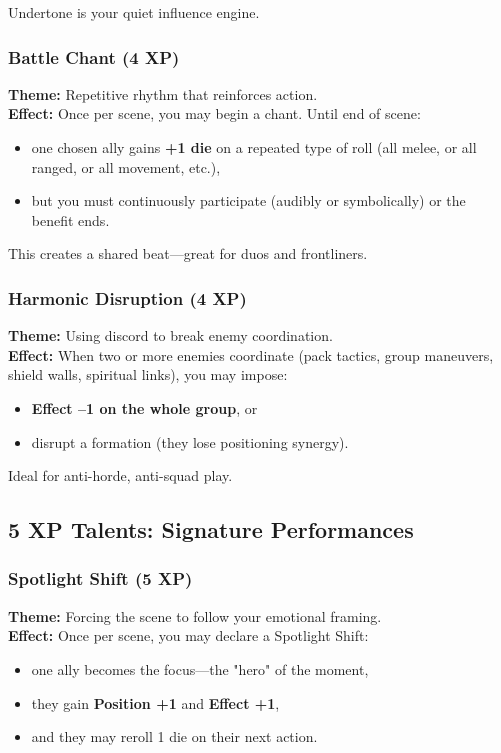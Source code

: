 \documentclass[11pt]{book}
\begin{document}
Undertone is your quiet influence engine.

\subsubsection{Battle Chant (4 XP)}
\textbf{Theme:} Repetitive rhythm that reinforces action.\\
\textbf{Effect:} Once per scene, you may begin a chant.
Until end of scene:
\begin{itemize}
  \item one chosen ally gains \textbf{+1 die} on a repeated type of roll
        (all melee, or all ranged, or all movement, etc.),
  \item but you must continuously participate (audibly or symbolically)
        or the benefit ends.
\end{itemize}

This creates a shared beat---great for duos and frontliners.

\subsubsection{Harmonic Disruption (4 XP)}
\textbf{Theme:} Using discord to break enemy coordination.\\
\textbf{Effect:} When two or more enemies coordinate (pack tactics,
group maneuvers, shield walls, spiritual links),
you may impose:
\begin{itemize}
  \item \textbf{Effect --1 on the whole group}, or
  \item disrupt a formation (they lose positioning synergy).
\end{itemize}

Ideal for anti-horde, anti-squad play.

\subsection{5 XP Talents: Signature Performances}

\subsubsection{Spotlight Shift (5 XP)}
\textbf{Theme:} Forcing the scene to follow your emotional framing.\\
\textbf{Effect:} Once per scene, you may declare a Spotlight Shift:
\begin{itemize}
  \item one ally becomes the focus---the "hero" of the moment,
  \item they gain \textbf{Position +1} and \textbf{Effect +1},
  \item and they may reroll 1 die on their next action.
\end{itemize}
\end{document}
